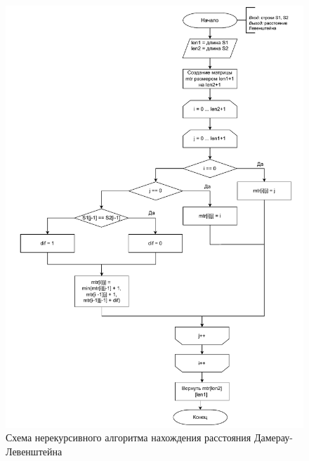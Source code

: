 \begin{figure}[h]
	\centering
	\includegraphics[height=0.9\textheight, page=2]{img/algoritms.pdf}
	\caption{Схема нерекурсивного алгоритма нахождения расстояния Дамерау-Левенштейна}
	\label{fig:DLiter}
\end{figure}

\clearpage

